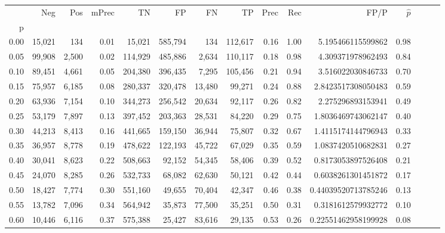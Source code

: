 \begin{tabular}{rrrrrrrrrrrrrrr}
\toprule
{} &     Neg &    Pos & mPrec &       TN &       FP &       FN &       TP &  Prec &   Rec &                  FP/P & $\hat{p}$ \\
p    &         &        &       &          &          &          &          &       &       &                       &           \\
\midrule
0.00 &  15,021 &    134 &  0.01 &   15,021 &  585,794 &      134 &  112,617 &  0.16 &  1.00 &     5.195466115599862 &      0.98 \\
0.05 &  99,908 &  2,500 &  0.02 &  114,929 &  485,886 &    2,634 &  110,117 &  0.18 &  0.98 &     4.309371978962493 &      0.84 \\
0.10 &  89,451 &  4,661 &  0.05 &  204,380 &  396,435 &    7,295 &  105,456 &  0.21 &  0.94 &     3.516022030846733 &      0.70 \\
0.15 &  75,957 &  6,185 &  0.08 &  280,337 &  320,478 &   13,480 &   99,271 &  0.24 &  0.88 &    2.8423517308050483 &      0.59 \\
0.20 &  63,936 &  7,154 &  0.10 &  344,273 &  256,542 &   20,634 &   92,117 &  0.26 &  0.82 &     2.275296893153941 &      0.49 \\
0.25 &  53,179 &  7,897 &  0.13 &  397,452 &  203,363 &   28,531 &   84,220 &  0.29 &  0.75 &    1.8036469743062147 &      0.40 \\
0.30 &  44,213 &  8,413 &  0.16 &  441,665 &  159,150 &   36,944 &   75,807 &  0.32 &  0.67 &    1.4115174144796943 &      0.33 \\
0.35 &  36,957 &  8,778 &  0.19 &  478,622 &  122,193 &   45,722 &   67,029 &  0.35 &  0.59 &    1.0837420510682831 &      0.27 \\
0.40 &  30,041 &  8,623 &  0.22 &  508,663 &   92,152 &   54,345 &   58,406 &  0.39 &  0.52 &    0.8173053897526408 &      0.21 \\
0.45 &  24,070 &  8,285 &  0.26 &  532,733 &   68,082 &   62,630 &   50,121 &  0.42 &  0.44 &    0.6038261301451872 &      0.17 \\
0.50 &  18,427 &  7,774 &  0.30 &  551,160 &   49,655 &   70,404 &   42,347 &  0.46 &  0.38 &   0.44039520713785246 &      0.13 \\
0.55 &  13,782 &  7,096 &  0.34 &  564,942 &   35,873 &   77,500 &   35,251 &  0.50 &  0.31 &    0.3181612579932772 &      0.10 \\
0.60 &  10,446 &  6,116 &  0.37 &  575,388 &   25,427 &   83,616 &   29,135 &  0.53 &  0.26 &   0.22551462958199928 &      0.08 \\

\end{tabular}
